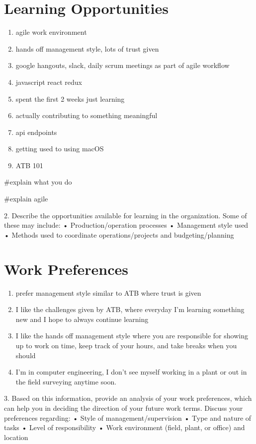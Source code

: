\documentclass[letterpaper,12pt]{article}
\begin{document}
\section{Learning Opportunities}
\begin{enumerate}
 \item agile work environment
 \item hands off management style, lots of trust given
 \item google hangouts, slack, daily scrum meetings as part of agile workflow
 \item javascript react redux
 \item spent the first 2 weeks just learning
 \item actually contributing to something meaningful
 \item api endpoints
 \item getting used to using macOS
 \item ATB 101
\end{enumerate}

\#explain what you do

\#explain agile

2.	Describe the opportunities available for learning in the organization. Some of these may include:
•	Production/operation processes
•	Management style used
•	Methods used to coordinate operations/projects and budgeting/planning

\section{Work Preferences}

\begin{enumerate}
 \item prefer management style similar to ATB where trust is given
 \item I like the challenges given by ATB, where everyday I'm learning something new and I hope
       to always continue learning
 \item I like the hands off management style where you are responsible for showing up to work on time, keep track of your hours,
       and take breaks when you should
 \item I'm in computer engineering, I don't see myself working in a plant or out in the field surveying anytime soon.
\end{enumerate}

3.	Based on this information, provide an analysis of your work preferences, which can help you in deciding the direction of your future work terms. Discuss your preferences regarding:
•	Style of management/supervision
•	Type and nature of tasks
•	Level of responsibility
•	Work environment (field, plant, or office) and location


\nocite{*}

\end{document}
